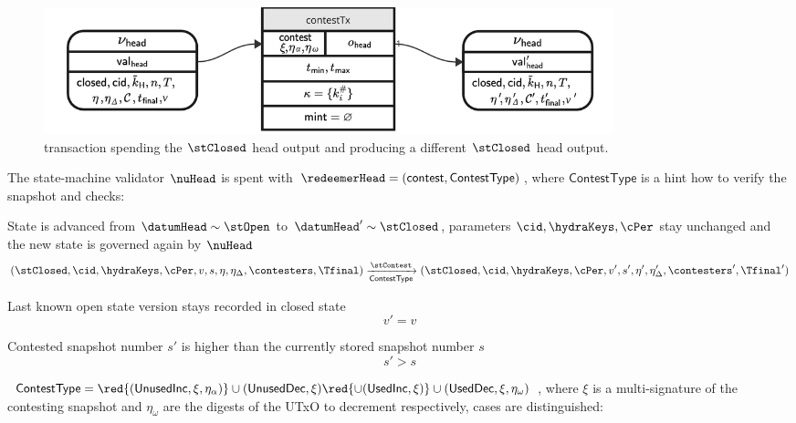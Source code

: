 \begin{figure}
        \includegraphics[width=0.8\textwidth]{Hydra/Protocol/Figures/contestTx.pdf}
	\caption{\mtxContest{} transaction spending the $\stClosed$ head output and
		producing a different $\stClosed$ head output.}\label{fig:contestTx}
\end{figure}

\noindent The state-machine validator $\nuHead$ is spent with
$\redeemerHead = (\mathsf{contest}, \mathsf{ContestType})$, where
$\mathsf{ContestType}$ is a hint how to verify the snapshot and checks:
\begin{menumerate}
	\item State is advanced from $\datumHead \sim \stOpen$ to
	$\datumHead' \sim \stClosed$, parameters $\cid,\hydraKeys,\cPer$
	stay unchanged and the new state is governed again by $\nuHead$
	\[
		(\stClosed,\cid,\hydraKeys,\cPer,v,s,\eta,\eta_{\Delta},\contesters,\Tfinal) \xrightarrow[\mathsf{ContestType}]{\stContest} (\stClosed,\cid,\hydraKeys,\cPer,v',s',\eta',\eta_{\Delta}',\contesters',\Tfinal')
	\]

	\item Last known open state version stays recorded in closed state
	\[
		v' = v
	\]

	\item Contested snapshot number $s'$ is higher than the currently stored snapshot number $s$
	\[
		s' > s
	\]
\item $\mathsf{ContestType} = \red{(\mathsf{UnusedInc}, \xi, \eta_\alpha)} \cup (\mathsf{UnusedDec}, \xi) \red{\cup (\mathsf{UsedInc}, \xi)}  \cup (\mathsf{UsedDec}, \xi, \eta_\omega)$, where $\xi$ is a multi-signature of the contesting snapshot  and $\eta_\omega$ are the digests of the UTxO to  decrement respectively,  cases are distinguished:

	\begin{menumerate}
		\item {}


\end{menumerate}
\end{menumerate}
